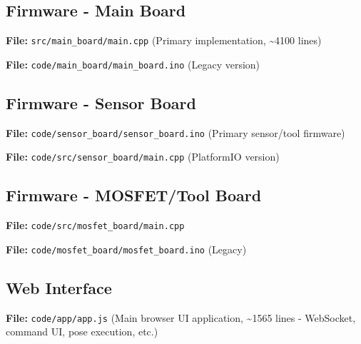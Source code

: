 \subsection*{Firmware - Main Board}
\textbf{File:} \texttt{src/main_board/main.cpp} (Primary implementation, \textasciitilde 4100 lines)



\textbf{File:} \texttt{code/main_board/main_board.ino} (Legacy version)



\subsection*{Firmware - Sensor Board}
\textbf{File:} \texttt{code/sensor_board/sensor_board.ino} (Primary sensor/tool firmware)



\textbf{File:} \texttt{code/src/sensor_board/main.cpp} (PlatformIO version)



\subsection*{Firmware - MOSFET/Tool Board}
\textbf{File:} \texttt{code/src/mosfet_board/main.cpp} 



\textbf{File:} \texttt{code/mosfet_board/mosfet_board.ino} (Legacy)



\subsection*{Web Interface}
\textbf{File:} \texttt{code/app/app.js} (Main browser UI application, \textasciitilde 1565 lines - WebSocket, command UI, pose execution, etc.)

